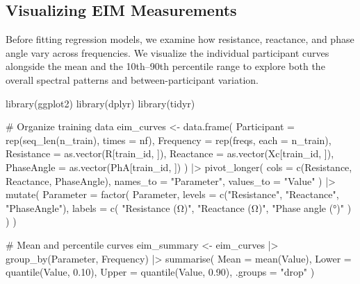 \documentclass[
  letterpaper,
  DIV=11,
  numbers=noendperiod]{scrreprt}
\newenvironment{Shaded}{\begin{snugshade}}{\end{snugshade}}
\newcommand{\AttributeTok}[1]{\textcolor[rgb]{0.40,0.45,0.13}{#1}}
\newcommand{\CommentTok}[1]{\textcolor[rgb]{0.37,0.37,0.37}{#1}}
\newcommand{\FloatTok}[1]{\textcolor[rgb]{0.68,0.00,0.00}{#1}}
\newcommand{\FunctionTok}[1]{\textcolor[rgb]{0.28,0.35,0.67}{#1}}
\newcommand{\NormalTok}[1]{\textcolor[rgb]{0.00,0.23,0.31}{#1}}
\newcommand{\OtherTok}[1]{\textcolor[rgb]{0.00,0.23,0.31}{#1}}
\newcommand{\SpecialCharTok}[1]{\textcolor[rgb]{0.37,0.37,0.37}{#1}}
\newcommand{\StringTok}[1]{\textcolor[rgb]{0.13,0.47,0.30}{#1}}
\begin{document}
\subsection{Visualizing EIM
Measurements}\label{visualizing-eim-measurements}

Before fitting regression models, we examine how resistance, reactance,
and phase angle vary across frequencies. We visualize the individual
participant curves alongside the mean and the 10th--90th percentile
range to explore both the overall spectral patterns and
between-participant variation.

\begin{Shaded}
\begin{Highlighting}[]
\FunctionTok{library}\NormalTok{(ggplot2)}
\FunctionTok{library}\NormalTok{(dplyr)}
\FunctionTok{library}\NormalTok{(tidyr)}

\CommentTok{\# Organize training data}
\NormalTok{eim\_curves }\OtherTok{\textless{}{-}} \FunctionTok{data.frame}\NormalTok{(}
  \AttributeTok{Participant =} \FunctionTok{rep}\NormalTok{(}\FunctionTok{seq\_len}\NormalTok{(n\_train), }\AttributeTok{times =}\NormalTok{ nf),}
  \AttributeTok{Frequency =} \FunctionTok{rep}\NormalTok{(freqs, }\AttributeTok{each =}\NormalTok{ n\_train),}
  \AttributeTok{Resistance =} \FunctionTok{as.vector}\NormalTok{(R[train\_id, ]),}
  \AttributeTok{Reactance =} \FunctionTok{as.vector}\NormalTok{(Xc[train\_id, ]),}
  \AttributeTok{PhaseAngle =} \FunctionTok{as.vector}\NormalTok{(PhA[train\_id, ])}
\NormalTok{) }\SpecialCharTok{|\textgreater{}}
  \FunctionTok{pivot\_longer}\NormalTok{(}
    \AttributeTok{cols =} \FunctionTok{c}\NormalTok{(Resistance, Reactance, PhaseAngle),}
    \AttributeTok{names\_to =} \StringTok{"Parameter"}\NormalTok{,}
    \AttributeTok{values\_to =} \StringTok{"Value"}
\NormalTok{  ) }\SpecialCharTok{|\textgreater{}}
  \FunctionTok{mutate}\NormalTok{(}
    \AttributeTok{Parameter =} \FunctionTok{factor}\NormalTok{(}
\NormalTok{      Parameter,}
      \AttributeTok{levels =} \FunctionTok{c}\NormalTok{(}\StringTok{"Resistance"}\NormalTok{, }\StringTok{"Reactance"}\NormalTok{, }\StringTok{"PhaseAngle"}\NormalTok{),}
      \AttributeTok{labels =} \FunctionTok{c}\NormalTok{(}
        \StringTok{"Resistance (Ω)"}\NormalTok{,}
        \StringTok{"Reactance (Ω)"}\NormalTok{,}
        \StringTok{"Phase angle (°)"}
\NormalTok{      )}
\NormalTok{    )}
\NormalTok{  )}

\CommentTok{\# Mean and percentile curves}
\NormalTok{eim\_summary }\OtherTok{\textless{}{-}}\NormalTok{ eim\_curves }\SpecialCharTok{|\textgreater{}}
  \FunctionTok{group\_by}\NormalTok{(Parameter, Frequency) }\SpecialCharTok{|\textgreater{}}
  \FunctionTok{summarise}\NormalTok{(}
    \AttributeTok{Mean =} \FunctionTok{mean}\NormalTok{(Value),}
    \AttributeTok{Lower =} \FunctionTok{quantile}\NormalTok{(Value, }\FloatTok{0.10}\NormalTok{),}
    \AttributeTok{Upper =} \FunctionTok{quantile}\NormalTok{(Value, }\FloatTok{0.90}\NormalTok{),}
    \AttributeTok{.groups =} \StringTok{"drop"}
\NormalTok{  )}


\end{Highlighting}
\end{Shaded}
\end{document}
